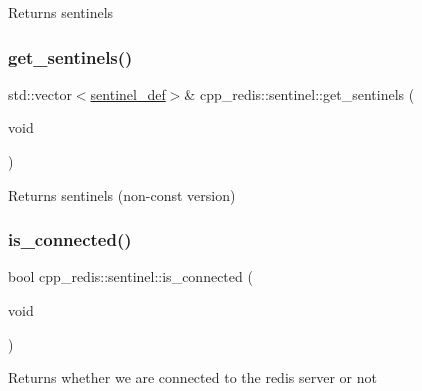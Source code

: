\begin{DoxyReturn}{Returns}
sentinels 
\end{DoxyReturn}
\mbox{\label{classcpp__redis_1_1sentinel_a62cc14b7795d746cc7d0053c1e0a3abd}} 
\subsubsection{\texorpdfstring{get\+\_\+sentinels()}{get\_sentinels()}\hspace{0.1cm}{\footnotesize\ttfamily [2/2]}}
{\footnotesize\ttfamily std\+::vector$<$\mbox{\hyperlink{classcpp__redis_1_1sentinel_1_1sentinel__def}{sentinel\+\_\+def}}$>$\& cpp\+\_\+redis\+::sentinel\+::get\+\_\+sentinels (\begin{DoxyParamCaption}\item[{void}]{ }\end{DoxyParamCaption})}

\begin{DoxyReturn}{Returns}
sentinels (non-\/const version) 
\end{DoxyReturn}
\mbox{\label{classcpp__redis_1_1sentinel_aa98a0593e6e7c04d8d0dd1f292cdce47}} 
\subsubsection{\texorpdfstring{is\+\_\+connected()}{is\_connected()}}
{\footnotesize\ttfamily bool cpp\+\_\+redis\+::sentinel\+::is\+\_\+connected (\begin{DoxyParamCaption}\item[{void}]{ }\end{DoxyParamCaption})}

\begin{DoxyReturn}{Returns}
whether we are connected to the redis server or not 
\end{DoxyReturn}
\mbox{\label{classcpp__redis_1_1sentinel_a0df522dbd7debda4e73f616a62d6f5ee}} 
